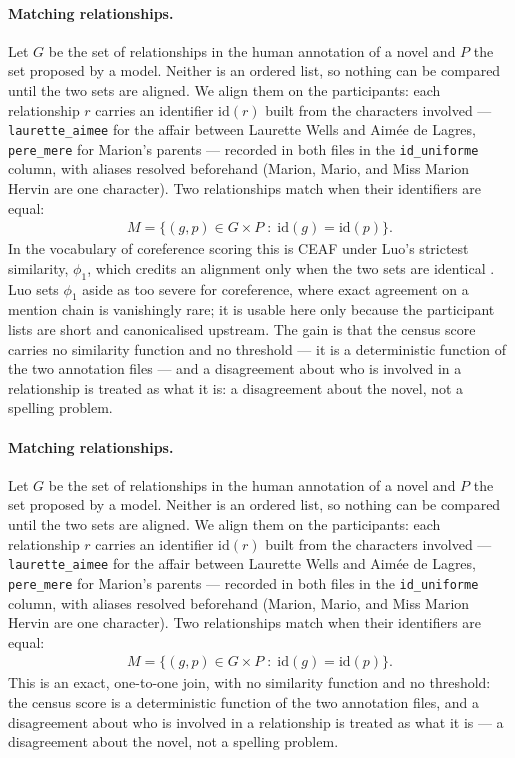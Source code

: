\paragraph{Matching relationships.} Let $G$ be the set of relationships in the
human annotation of a novel and $P$ the set proposed by a model. Neither is an
ordered list, so nothing can be compared until the two sets are aligned. We
align them on the participants: each relationship $r$ carries an identifier
$\mathrm{id}(r)$ built from the characters involved ---
\texttt{laurette\_aimee} for the affair between Laurette Wells and Aimée de
Lagres, \texttt{pere\_mere} for Marion's parents --- recorded in both files in
the \texttt{id\_uniforme} column, with aliases resolved beforehand (Marion,
Mario, and Miss Marion Hervin are one character). Two relationships match when
their identifiers are equal:
%
\begin{align}
M = \{(g,p) \in G \times P \;:\; \mathrm{id}(g) = \mathrm{id}(p)\} .
\end{align}
%
In the vocabulary of coreference scoring this is CEAF under Luo's strictest
similarity, $\phi_1$, which credits an alignment only when the two sets are
identical \cite{luo2005coreference}. Luo sets $\phi_1$ aside as too severe for
coreference, where exact agreement on a mention chain is vanishingly rare; it is
usable here only because the participant lists are short and canonicalised
upstream. The gain is that the census score carries no similarity function and
no threshold --- it is a deterministic function of the two annotation files ---
and a disagreement about who is involved in a relationship is treated as what it
is: a disagreement about the novel, not a spelling problem.

\paragraph{Matching relationships.} Let $G$ be the set of relationships in the human
annotation of a novel and $P$ the set proposed by a model. Neither is an ordered
list, so nothing can be compared until the two sets are aligned. We align them on
the participants: each relationship $r$ carries an identifier $\mathrm{id}(r)$ built
from the characters involved --- \texttt{laurette\_aimee} for the affair between
Laurette Wells and Aimée de Lagres, \texttt{pere\_mere} for Marion's parents ---
recorded in both files in the \texttt{id\_uniforme} column, with aliases resolved
beforehand (Marion, Mario, and Miss Marion Hervin are one character). Two
relationships match when their identifiers are equal:
%
\begin{align}
M = \{(g,p) \in G \times P \;:\; \mathrm{id}(g) = \mathrm{id}(p)\} .
\end{align}
%
This is an exact, one-to-one join, with no similarity function and no threshold: the
census score is a deterministic function of the two annotation files, and a
disagreement about who is involved in a relationship is treated as what it is --- a
disagreement about the novel, not a spelling problem.


